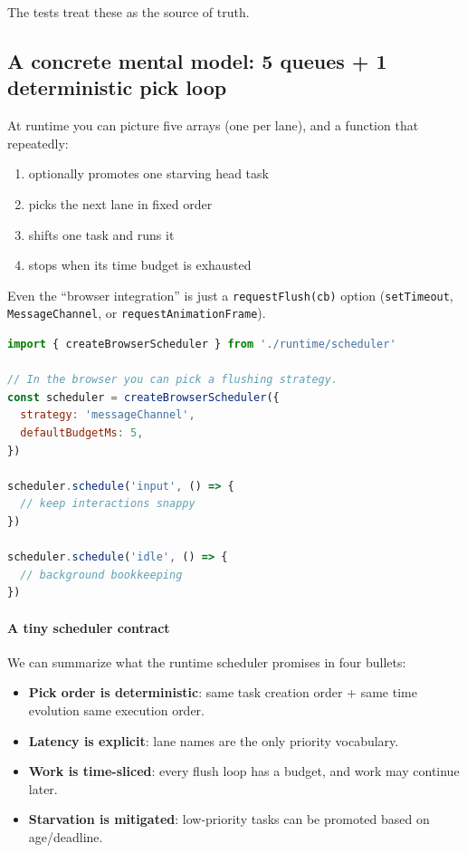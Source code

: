 The tests treat these as the source of truth.

\subsection{A concrete mental model: 5 queues + 1 deterministic pick loop}

At runtime you can picture five arrays (one per lane), and a function that repeatedly:

\begin{enumerate}
  \item optionally promotes one starving head task
  \item picks the next lane in fixed order
  \item shifts one task and runs it
  \item stops when its time budget is exhausted
\end{enumerate}

Even the ``browser integration'' is just a \texttt{requestFlush(cb)} option (\texttt{setTimeout}, \texttt{MessageChannel}, or \texttt{requestAnimationFrame}).

\begin{lstlisting}[language=JavaScript]
import { createBrowserScheduler } from './runtime/scheduler'

// In the browser you can pick a flushing strategy.
const scheduler = createBrowserScheduler({
  strategy: 'messageChannel',
  defaultBudgetMs: 5,
})

scheduler.schedule('input', () => {
  // keep interactions snappy
})

scheduler.schedule('idle', () => {
  // background bookkeeping
})
\end{lstlisting}

\paragraph{A tiny scheduler contract}

We can summarize what the runtime scheduler promises in four bullets:

\begin{itemize}
  \item \textbf{Pick order is deterministic}: same task creation order + same time evolution \textrightarrow same execution order.
  \item \textbf{Latency is explicit}: lane names are the only priority vocabulary.
  \item \textbf{Work is time-sliced}: every flush loop has a budget, and work may continue later.
  \item \textbf{Starvation is mitigated}: low-priority tasks can be promoted based on age/deadline.
\end{itemize}

